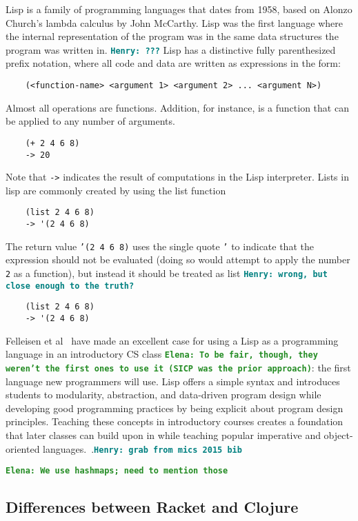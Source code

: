 \documentclass[12pt]{article}
\newcommand{\comment}[1]{{\bf \tt  {#1}}}
\newcommand{\emcomment}[1]{\textcolor{ForestGreen}{\comment{Elena: {#1}}}}
\newcommand{\hfcomment}[1]{\textcolor{Teal}{\comment{Henry: {#1}}}}
\begin{document}
	Lisp is a family of programming languages that dates from 1958, based on Alonzo Church's lambda calculus 
	 by John McCarthy. Lisp was the first language where the internal representation of the program was in the same data structures the program was written in. \hfcomment{???} Lisp has a distinctive fully parenthesized prefix notation, where all code and data are written as expressions in the form:
	\begin{verbatim}
	(<function-name> <argument 1> <argument 2> ... <argument N>)
	\end{verbatim}
Almost all operations are functions. Addition, for instance, is a function that can be applied to any number of arguments.
	\begin{verbatim}
	(+ 2 4 6 8)
	-> 20
	\end{verbatim}
Note that \texttt{->} indicates the result of computations in the Lisp interpreter. Lists in lisp are commonly created by using the list function
 	\begin{verbatim}
	(list 2 4 6 8)
	-> '(2 4 6 8)
	\end{verbatim}
The return value \texttt{'(2 4 6 8)} uses the single quote \texttt{'} to indicate that the expression should not be evaluated (doing so would attempt to apply the number \texttt{2} as a function), but instead it should be treated as list \hfcomment{wrong, but close enough to the truth?}	
	\begin{verbatim}
	(list 2 4 6 8)
	-> '(2 4 6 8)
	\end{verbatim}
	
	Felleisen et al~\cite{Felleisen:2004} have made an excellent case for using a Lisp as a programming language in an introductory CS class
	\emcomment{To be fair, though, they weren't the first ones to use it (SICP was the prior approach)}:
the first language new programmers will use. Lisp offers a simple
syntax and introduces students to modularity, abstraction, and
data-driven program design while developing good programming
practices by being explicit about program design principles.
Teaching these concepts in introductory courses creates a foundation that later classes can build upon in  while teaching popular imperative and object-oriented languages.~\cite{Bieniusa:2008}.\hfcomment{grab from mics 2015 bib} 

\emcomment{We use hashmaps; need to mention those}
	\subsection{Differences between Racket and Clojure}\label{sec:diff}
	
\end{document}
